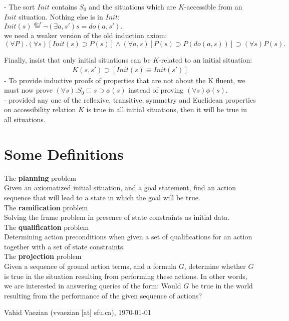 \documentclass[fleqn]{report}
\begin{document}
- The sort $Init$ contains $S_0$ and the situations which are $K$-accessible from an $Init$ situation. Nothing else is in $Init$:\\
$Init(s)\stackrel{def}{=}\neg(\exists a,s')s=do(a,s').$\\
we need a weaker version of the old induction axiom:
\begin{equation}
 (\forall P).(\forall s)[Init(s)\supset P(s)]\land(\forall a,s)[P(s)\supset P(do(a,s))]\supset(\forall s)P(s).
\end{equation}

Finally, insist that only initial situations can be $K$-related to an initial situation:
\begin{align}K(s,s')\supset[Init(s)\equiv Init(s')]\end{align}
- To provide inductive proofs of properties that are not about the K fluent, we must now prove \mbox{$(\forall s).S_0\sqsubset s\supset \phi(s)$} instead of proving $(\forall s) \phi(s)$.\\

- provided any one of the reflexive, transitive, symmetry and Euclidean properties on accessibility relation $K$ is true in all initial situations, then it will be true in all situations.\\

\newpage
\section*{Some Definitions}
The \textbf{planning} problem\\ Given an axiomatized initial situation, and a goal statement, find an action sequence that will lead to a state in which the goal will be true.\\

The \textbf{ramification} problem\\ Solving the frame problem in presence of state constraints as initial data.\\

The \textbf{qualification} problem\\ Determining action preconditions when given a set of qualifications for an action together with a set of state constraints.\\

The \textbf{projection} problem\\ Given a sequence of ground action terms, and a formula $G$, determine whether $G$ is true in the situation resulting from performing these actions.
                                 In other words, we are interested in answering queries of the form: Would $G$ be true in the world resulting from the performance of the given sequence of actions?

\hfill
\begin{flushright}
\small{Vahid Vaezian (vvaezian [at] sfu.ca), \today}
\end{flushright}
\end{document}
